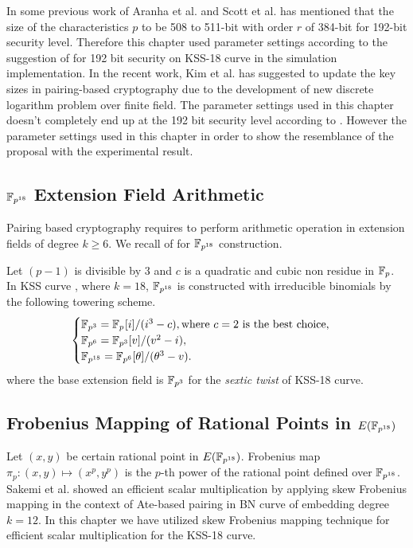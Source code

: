 In some previous work of  Aranha et al. \cite{PAIRING:AFKMR12} and Scott et al. \cite{IMA:Scott11} has mentioned that the size of the characteristics $p$ to be 508 to 511-bit with order $r$ of 384-bit  for 192-bit security level.  
Therefore this chapter used parameter settings according to the suggestion of \cite{PAIRING:AFKMR12} for 192 bit security on KSS-18 curve in the simulation implementation. In the recent work, Kim et al. \cite{C:KimBar16} has suggested to update the key sizes in pairing-based cryptography due to the  development of new discrete logarithm problem over finite field. The parameter settings used in this chapter doesn't completely end up at the 192 bit security level according to \cite{C:KimBar16}. However the parameter settings used in this chapter in order to show the resemblance of the proposal with the experimental result.

\subsection{\texorpdfstring{$\mathbb{F}_{p^{18}}$}{Fp18} Extension Field Arithmetic}
Pairing based cryptography requires to perform arithmetic operation in extension fields of degree $k \geq 6$\cite{Silverman}. 
We recall  of  for $\mathbb{F}_{p^{18}}$ construction.

Let $(p-1)$ is divisible by 3 and $c$ is a quadratic and cubic non residue in ${\mathbb{F}}_{p}$. In KSS curve \cite{EPRINT:KacSchSco07}, where $k=18$, $\mathbb{F}_{p^{18}}$ is constructed  with irreducible binomials by the following towering scheme.
\begin{equation}
\begin{cases}
{\mathbb{F}}_{p^{3}} = {\mathbb{F}}_{p^{}}[i]/(i^3-c),  \text{where $c = 2$ is the best choice,}\nonumber \\ 
{\mathbb{F}}_{p^{6}} = {\mathbb{F}}_{p^{3}}[v]/(v^2-i), \nonumber \\ 
{\mathbb{F}}_{p^{18}} = {\mathbb{F}}_{p^{6}}[\theta]/(\theta^3-v). \nonumber \\ 
\end{cases}
\end{equation}\label{eq:KSS18_towering_chapter_g2scm_kss18}
where the base extension field is $\mathbb{F}_{p^3}$ for the \textit{sextic twist} of KSS-18 curve.

\subsection{Frobenius Mapping of Rational Points in  \texorpdfstring{ $E(\mathbb{F}_{p^{18}})$}{E(Fp18)}}
Let $(x,y)$ be certain rational point in $E(\mathbb{F}_{p^{18}})$. 
Frobenius map $\pi_p : (x,y) \mapsto  (x^p,y^p)$ is the $p$-th power of the rational point defined over $\mathbb{F}_{p^{18}}$. 
Sakemi et al. \cite{CANS:SNOKM08} showed an efficient scalar multiplication by applying skew Frobenius mapping in the context of Ate-based pairing in BN curve of embedding degree $k=12$.  In this chapter we have utilized skew Frobenius mapping technique for efficient scalar multiplication for the KSS-18 curve.

